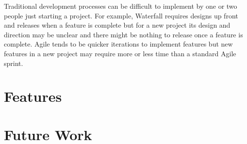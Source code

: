 \documentclass{article}
\begin{document}
    Traditional development processes can be difficult to implement by one or two people just starting a project. For example, Waterfall requires designs up front and releases when a feature is complete but for a new project its design and direction may be unclear and there might be nothing to release once a feature is complete. Agile tends to be quicker iterations to implement features but new features in a new project may require more or less time than a standard Agile sprint.  
\section{Features}
\section{Future Work}\label{future-work}

\printbibliography[title={Bibliography}]
\end{document}
